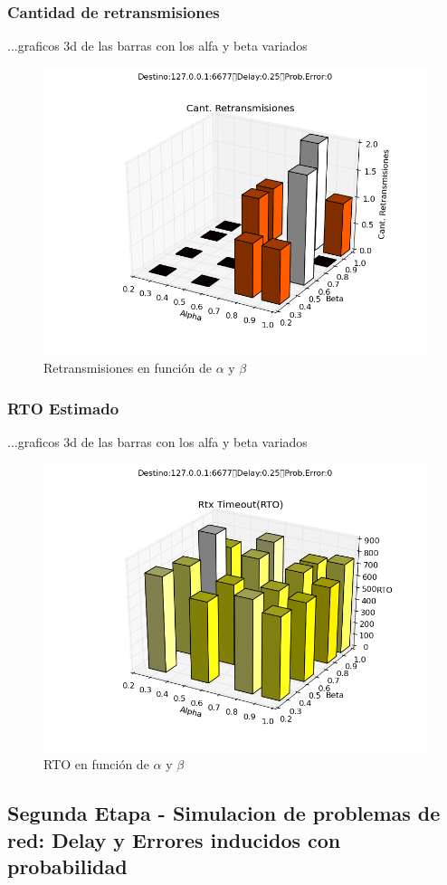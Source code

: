 \subsubsection{Cantidad de retransmisiones}
	...graficos 3d de las barras con los alfa y beta variados

\begin{figure}[H]
  \centering	
	\includegraphics[scale=0.5]{../analisis/graficos_tablas/graficos_en_funcion_de_alfa_y_beta/graficos/retransmisiones.png}
  \caption{Retransmisiones en funci\'on de $\alpha$ y $\beta$}
	\label{fig:histo-src-sitiotrabajo}
\end{figure}

\subsubsection{RTO Estimado}
	...graficos 3d de las barras con los alfa y beta variados

\begin{figure}[H]
  \centering	
	\includegraphics[scale=0.5]{../analisis/graficos_tablas/graficos_en_funcion_de_alfa_y_beta/graficos/rto.png}
  \caption{RTO en funci\'on de $\alpha$ y $\beta$}
	\label{fig:histo-src-sitiotrabajo}
\end{figure}

\subsection{Segunda Etapa - Simulacion de problemas de red: Delay y Errores inducidos con probabilidad}